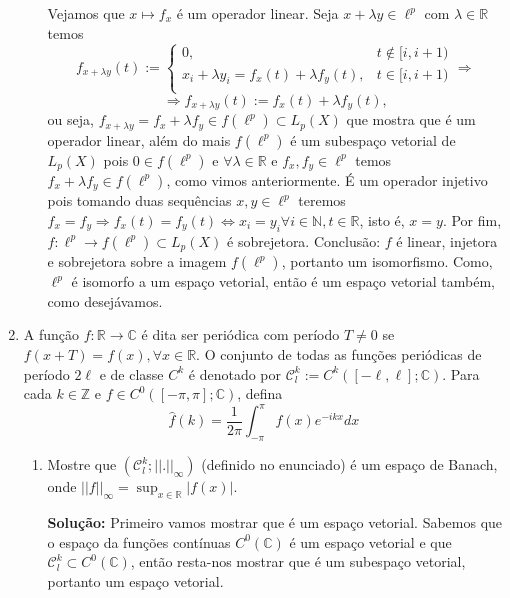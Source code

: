 \documentclass{article}
\begin{document}
\begin{enumerate}
\begin{enumerate}
				Vejamos que $x \mapsto f_{x}$ é um operador linear. Seja $x + \lambda y \in \ell^{p}$ com $\lambda \in \mathbb{R}$ temos
				$$
				f_{x + \lambda y }(t) := \left\{
				\begin{array}{cc}
				0, & t \notin [i, i+1)\\
				x_{i} +\lambda y_{i} = f_{x}(t) + \lambda f_{y}(t), & t \in [i, i+1) \\
				\end{array}
				\right. \Rightarrow				
				$$
				$$
				\Rightarrow f_{x + \lambda y }(t) := f_{x}(t) + \lambda f_{y}(t),
				$$
				ou seja, $f_{x + \lambda y } = f_{x} + \lambda f_{y } \in f(\ell^{p}) \subset L_{p}(X)$ que mostra que é um operador linear, além do mais $f(\ell^{p})$ é um subespaço vetorial de $L_{p}(X)$ pois $0 \in f(\ell^{p})$ e $\forall \lambda \in \mathbb{R}$ e $f_{x}, f_{y} \in \ell^{p}$ temos $f_{x} + \lambda f_{y } \in f(\ell^{p})$, como vimos anteriormente. É um operador injetivo pois tomando duas sequências $x, y \in \ell^{p}$ teremos $f_{x} = f_{y} \Rightarrow f_{x}(t) = f_{y}(t) \iff x_{i} = y_{i} \forall i \in \mathbb{N}, t \in \mathbb{R}$, isto é, $x=y$. Por fim, $f: \ell^{p} \to f(\ell^{p}) \subset L_{p}(X)$ é sobrejetora. Conclusão: $f$ é linear, injetora e sobrejetora sobre a imagem $f(\ell^{p})$, portanto um isomorfismo. Como, $\ell^{p}$ é isomorfo a um espaço vetorial, então é um espaço vetorial também, como desejávamos.
				
		\end{enumerate}
		
		
		\item A função $f:\mathbb{R} \to \mathbb{C}$ é dita ser periódica com período $T \neq 0$ se $f(x+T) = f(x), \forall x \in \mathbb{R} $. O conjunto de todas as funções periódicas de período $2\ell$ e de classe $C^{k}$ é denotado por $\mathcal{C}^{k}_{l}:=C^{k}([-\ell, \ell]; \mathbb{C})$. Para cada $k \in \mathbb{Z}$ e $f \in C^{0}([-\pi, \pi]; \mathbb{C})$, defina
		$$
		\hat{f}(k) = \frac{1}{2\pi}\int_{-\pi}^{\pi} f(x)e^{-ikx}dx
		$$
		
		\begin{enumerate}
			\item Mostre que $(\mathcal{C}^{k}_{l}; ||.||_{\infty})$ (definido no enunciado) é um espaço de Banach, onde $||f||_{\infty} = \sup_{x \in \mathbb{R}}|f(x)|$.
			
			\textbf{Solução:} Primeiro vamos mostrar que é um espaço vetorial. Sabemos que o espaço da funções contínuas $C^{0}(\mathbb{C})$ é um espaço vetorial e que $\mathcal{C}^{k}_{l} \subset C^{0}(\mathbb{C})$, então resta-nos mostrar que é um subespaço vetorial, portanto um espaço vetorial.
			

\end{enumerate}
\end{enumerate}
\end{document}
